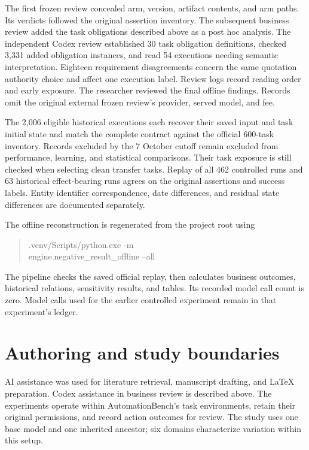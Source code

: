 \documentclass{ecai}
\begin{document}
The first frozen review concealed arm, version, artifact contents, and arm paths. Its verdicts followed the original assertion inventory. The subsequent business review added the task obligations described above as a post hoc analysis. The independent Codex review established 30 task obligation definitions, checked 3,331 added obligation instances, and read 54 executions needing semantic interpretation. Eighteen requirement disagreements concern the same quotation authority choice and affect one execution label. Review logs record reading order and early exposure. The researcher reviewed the final offline findings. Records omit the original external frozen review's provider, served model, and fee.

\balance
The 2,006 eligible historical executions each recover their saved input and task initial state and match the complete contract against the official 600-task inventory. Records excluded by the 7 October cutoff remain excluded from performance, learning, and statistical comparisons. Their task exposure is still checked when selecting clean transfer tasks. Replay of all 462 controlled runs and 63 historical effect-bearing runs agrees on the original assertions and success labels. Entity identifier correspondence, date differences, and residual state differences are documented separately.

The offline reconstruction is regenerated from the project root using
\begin{quote}
\small\ttfamily
.venv/Scripts/python.exe -m\\
engine.negative\_result\_offline --all
\end{quote}
The pipeline checks the saved official replay, then calculates business outcomes, historical relations, sensitivity results, and tables. Its recorded model call count is zero. Model calls used for the earlier controlled experiment remain in that experiment's ledger.

\section{Authoring and study boundaries}

AI assistance was used for literature retrieval, manuscript drafting, and LaTeX preparation. Codex assistance in business review is described above. The experiments operate within AutomationBench's task environments, retain their original permissions, and record action outcomes for review. The study uses one base model and one inherited ancestor; six domains characterize variation within this setup.
\end{document}
